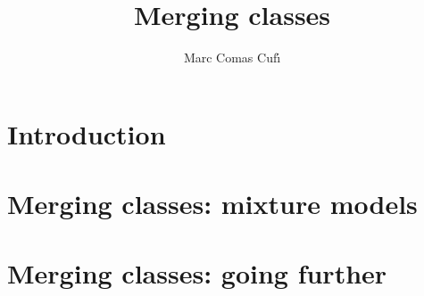\documentclass[10pt]{beamer}
\title{Merging classes}
\author{Marc Comas Cuf\'{\i}}
\date{}
\begin{document}
\begin{frame}
\titlepage
\end{frame}

\section{Introduction}



\section{Merging classes: mixture models}



\section{Merging classes: going further}


\end{document}
